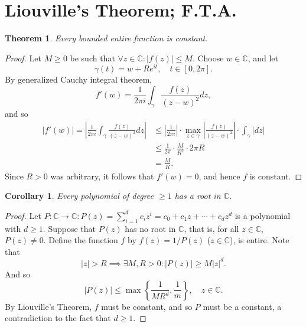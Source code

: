 \documentclass[12pt,openany]{book}
\newtheorem{theorem}{Theorem}[chapter]
\newtheorem{corollary}{Corollary}[theorem]
\theoremstyle{definition}
\newcommand{\set}[1]{\left\{#1\right\}}
\newcommand{\C}{\mathbb{C}}
\newcommand{\of}[1]{\left( #1 \right)}
\newcommand{\abs}[1]{\left\lvert #1 \right\rvert}
\begin{document}
	\section{Liouville's Theorem; F.T.A.}
	\begin{tcolorbox}[colback=white,colframe=thmcolor,arc=5pt,title={\color{white}\bf Liouville's Theorem}]
		\begin{theorem}
			Every bounded entire function is constant.
		\end{theorem}
	\end{tcolorbox}
	\begin{proof}
		Let $M\geq 0$ be such that $\forall z\in\C:\abs{f\of{z}}\leq M$. Choose $w\in\C$, and let \[
		\gamma\of{t}=w+Re^{it},\quad t\in[0,2\pi].
		\] By generalized Cauchy integral theorem, \[
		f'\of{w}=\frac{1}{2\pi i}\int_\gamma\frac{f\of{z}}{\of{z-w}^2}dz,
		\] and so \begin{align*}
		\abs{f'\of{w}}=\abs{\frac{1}{2\pi i}\int_\gamma\frac{f\of{z}}{\of{z-w}^2}dz}&\leq\abs{\frac{1}{2\pi i}}\cdot\max_{z\in\gamma}\abs{\frac{f\of{z}}{\of{z-w}^2}}\cdot\int_\gamma\abs{dz}\\
		&\leq\frac{1}{2\pi}\cdot\frac{M}{R^2}\cdot 2\pi R\\
		&=\frac{M}{R}.
		\end{align*} Since $R>0$ was arbitrary, it follows that $f'\of{w}=0$, and hence $f$ is constant.
	\end{proof}
	
	\begin{tcolorbox}[colback=white,colframe=corcolor,arc=5pt,title={\color{white}\bf Fundamental Theorem of Algebra}]
		\begin{corollary}
			Every polynomial of degree $\geq 1$ has a root in $\C$.
		\end{corollary}
	\end{tcolorbox}
	\begin{proof}
		Let $P:\C\to\C:P\of{z}=\sum_{i=1}^d c_iz^i=c_0+c_1z+\cdots+c_dz^d$ is a polynomial with $d\geq 1$. Suppose that $P(z)$ has no root in $\C$, that is, for all $z\in\C$, $P\of{z}\neq 0$. Define the function $f$ by $f\of{z}=1/P\of{z}$ ($z\in\C$), is entire. Note that \[
		\abs{z}>R\implies\exists M,R>0:\abs{P\of{z}}\geq M\abs{z}^d.
		\] And so \[
		\abs{P\of{z}}\leq\max\set{\frac{1}{MR^d},\frac{1}{m}},\quad z\in\C.
		\] By Liouville's Theorem, $f$ must be constant, and so $P$ must be a constant, a contradiction to the fact that $d\geq 1$.
	\end{proof}
	
	\newpage
\end{document}
